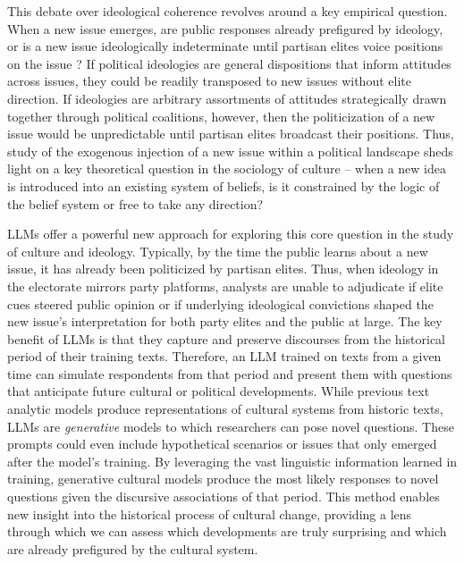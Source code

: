 \documentclass{article} %
\begin{document}
This debate over ideological coherence revolves around a key empirical
question. When a new issue emerges, are public responses already
prefigured by ideology, or is a new issue ideologically indeterminate
until partisan elites voice positions on the issue
\parencite{Noel2014-es, Page2010-yj, Zaller1992-eq}? If political ideologies are general
dispositions that inform attitudes across issues, they could be readily
transposed to new issues without elite direction. If ideologies are
arbitrary assortments of attitudes strategically drawn together through
political coalitions, however, then the politicization of a new issue
would be unpredictable until partisan elites broadcast their positions.
Thus, study of the exogenous injection of a new issue within a political
landscape sheds light on a key theoretical question in the sociology of
culture -- when a new idea is introduced into an existing system of
beliefs, is it constrained by the logic of the belief system or free to
take any direction?

LLMs offer a powerful new approach for exploring this core question in
the study of culture and ideology. Typically, by the time the public
learns about a new issue, it has already been politicized by partisan
elites. Thus, when ideology in the electorate mirrors party platforms,
analysts are unable to adjudicate if elite cues steered public opinion
or if underlying ideological convictions shaped the new issue's
interpretation for both party elites and the public at large. The key
benefit of LLMs is that they capture and preserve discourses from the
historical period of their training texts. Therefore, an LLM trained on
texts from a given time can simulate respondents from that period and
present them with questions that anticipate future cultural or political
developments. While previous text analytic models produce
representations of cultural systems from historic texts, LLMs are
\emph{generative} models to which researchers can pose novel questions.
These prompts could even include hypothetical scenarios or issues that
only emerged after the model's training. By leveraging the vast
linguistic information learned in training, generative cultural models
produce the most likely responses to novel questions given the
discursive associations of that period. This method enables new insight
into the historical process of cultural change, providing a lens through
which we can assess which developments are truly surprising and which
are already prefigured by the cultural system.
\end{document}
